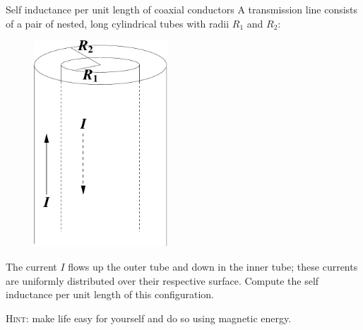 \documentclass[makesolutionspdf]{esg8022pset}
\begin{document}
\begin{problem}{Self inductance per unit length of coaxial conductors }
  A transmission line consists of a pair of nested, long cylindrical
  tubes with radii $R_1$ and $R_2$:

  \begin{figure}[H]
    \centering
    \includegraphics[width = 5cm]{coaxind}
    \label{fig:coax}
  \end{figure}

  The current $I$ flows up the outer tube and down in the
  inner tube; these currents are uniformly distributed over their
  respective surface.  Compute the self inductance per unit length of
  this configuration.
  
  \noindent \textsc{Hint}: make life easy for yourself and do so using
  magnetic energy.
\end{problem}
\end{document}
